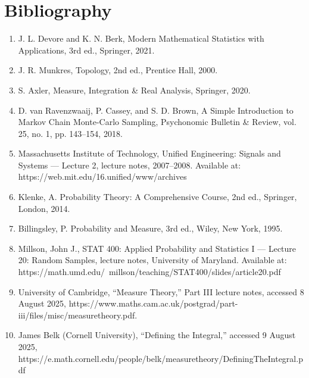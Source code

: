 \documentclass{article}
\begin{document}
\section*{Bibliography}
\begin{enumerate}
    \item J. L. Devore and K. N. Berk, Modern Mathematical Statistics with Applications, 3rd ed., Springer, 2021.
    \item J. R. Munkres, Topology, 2nd ed., Prentice Hall, 2000.
    \item S. Axler, Measure, Integration \& Real Analysis, Springer, 2020.
    \item D. van Ravenzwaaij, P. Cassey, and S. D. Brown, A Simple Introduction to Markov Chain Monte-Carlo Sampling, Psychonomic Bulletin \& Review, vol. 25, no. 1, pp. 143--154, 2018.
    \item Massachusetts Institute of Technology, Unified Engineering: Signals and Systems — Lecture 2, lecture notes, 2007–2008. \newline Available at: https://web.mit.edu/16.unified/www/archives%
    \item Klenke, A. Probability Theory: A Comprehensive Course, 2nd ed., Springer, London, 2014.
    \item Billingsley, P. Probability and Measure, 3rd ed., Wiley, New York, 1995.
    \item Millson, John J., STAT 400: Applied Probability and Statistics I — Lecture 20: Random Samples, lecture notes, University of Maryland. \newline
    Available at: https://math.umd.edu/~millson/teaching/STAT400/slides/article20.pdf
    \item University of Cambridge, “Measure Theory,” Part III lecture notes, \newline accessed 8 August 2025, https://www.maths.cam.ac.uk/postgrad/part-iii/files/misc/measuretheory.pdf.
    \item James Belk (Cornell University), “Defining the Integral,” \newline accessed 9 August 2025, \newline https://e.math.cornell.edu/people/belk/measuretheory/DefiningTheIntegral.pdf

\end{enumerate}
\end{document}
